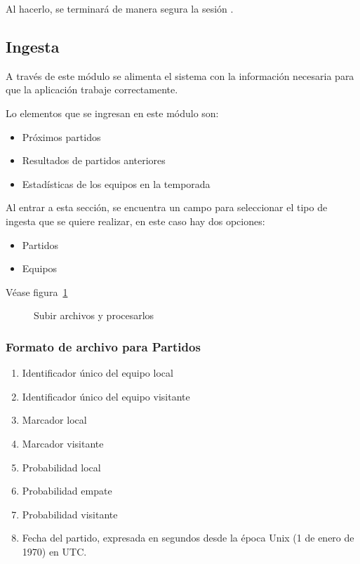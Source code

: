 Al hacerlo, se terminará de manera segura la sesión .
\subsection{Ingesta}
A través de este módulo se alimenta el sistema con la información necesaria para que la aplicación trabaje correctamente.

Lo elementos que se ingresan en este módulo son:

\begin{itemize}
\item Próximos partidos
\item Resultados de partidos anteriores
\item Estadísticas de los equipos en la temporada
\end{itemize}

Al entrar a esta sección, se encuentra un campo para seleccionar el tipo de ingesta que se quiere realizar, en este caso hay dos opciones:

\begin{itemize}
\item Partidos  
\item Equipos
\end{itemize}
Véase figura~\ref{Fig:ingesta}

\begin{figure}[!htb]\centering
   \begin {minipage}{0.8\textwidth}
     \caption[Subir y procesar archivos]{Subir archivos y procesarlos\footnotemark}
	 \label{Fig:ingesta}
   \end{minipage}
\end{figure}



\subsubsection{Formato de archivo para Partidos}

\begin{enumerate}
	\item Identificador único del equipo local
	\item Identificador único del equipo visitante
	\item Marcador local
	\item Marcador visitante
	\item Probabilidad local
	\item Probabilidad empate
	\item Probabilidad visitante
	\item Fecha del partido, expresada en segundos desde la época Unix (1 de enero
	de 1970) en UTC.
\end{enumerate}

